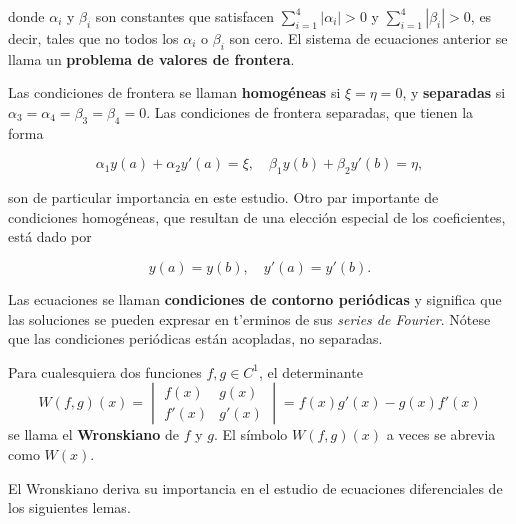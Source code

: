 \documentclass[main.tex]{subfiles}
\begin{document}
donde \( \alpha_i \) y \( \beta_i \) son constantes que satisfacen \( \sum_{i=1}^4 |\alpha_i| > 0 \) y \( \sum_{i=1}^4 |\beta_i| > 0 \), es decir, tales que no todos los \( \alpha_i \) o \( \beta_i \) son cero. El sistema de ecuaciones anterior se llama un \textbf{problema de valores de frontera}.

Las condiciones de frontera se llaman \textbf{homogéneas} si \( \xi = \eta = 0 \), y \textbf{separadas} si \( \alpha_3 = \alpha_4 = \beta_3 = \beta_4 = 0 \). Las condiciones de frontera separadas, que tienen la forma

\[
\alpha_1 y(a) + \alpha_2 y'(a) = \xi, \quad \beta_1 y(b) + \beta_2 y'(b) = \eta,
\]

son de particular importancia en este estudio. Otro par importante de condiciones homogéneas, que resultan de una elección especial de los coeficientes, está dado por

\[
y(a) = y(b), \quad y'(a) = y'(b).
\]

Las ecuaciones se llaman \textbf{condiciones de contorno periódicas} y significa que las soluciones se pueden expresar en t'erminos de sus \emph{series de Fourier}. Nótese que las condiciones periódicas están acopladas, no separadas.
\begin{def.}[Wronskiano]
Para cualesquiera dos funciones \( f, g \in C^1 \), el determinante
\[
W(f, g)(x) = \begin{vmatrix}
f(x) & g(x) \\
f'(x) & g'(x)
\end{vmatrix} = f(x)g'(x) - g(x)f'(x)
\]
se llama el \textbf{Wronskiano} de \( f \) y \( g \). El símbolo \( W(f, g)(x) \) a veces se abrevia como \( W(x) \).
\end{def.}

El Wronskiano deriva su importancia en el estudio de ecuaciones diferenciales de los siguientes lemas.
\end{document}
